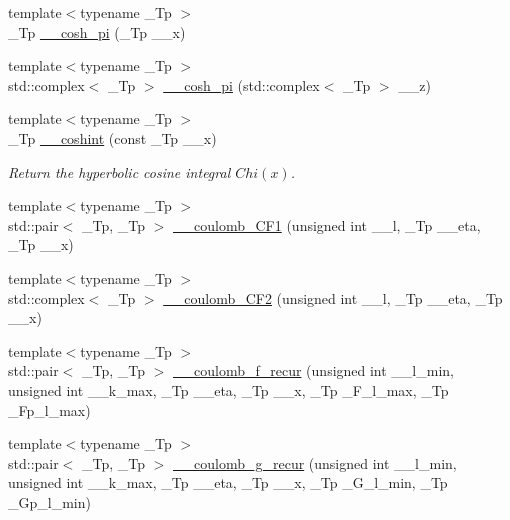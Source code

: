 \begin{DoxyCompactItemize}
\item 
{\footnotesize template$<$typename \+\_\+\+Tp $>$ }\\\+\_\+\+Tp \hyperlink{namespacestd_1_1____detail_ae6e440447e88191b3cd19daaf7fda96e}{\+\_\+\+\_\+cosh\+\_\+pi} (\+\_\+\+Tp \+\_\+\+\_\+x)
\item 
{\footnotesize template$<$typename \+\_\+\+Tp $>$ }\\std\+::complex$<$ \+\_\+\+Tp $>$ \hyperlink{namespacestd_1_1____detail_a257e13bd4fa9711a87ea68a783ee40d9}{\+\_\+\+\_\+cosh\+\_\+pi} (std\+::complex$<$ \+\_\+\+Tp $>$ \+\_\+\+\_\+z)
\item 
{\footnotesize template$<$typename \+\_\+\+Tp $>$ }\\\+\_\+\+Tp \hyperlink{namespacestd_1_1____detail_ad48a89a591f7b58a047f072e6e383663}{\+\_\+\+\_\+coshint} (const \+\_\+\+Tp \+\_\+\+\_\+x)
\begin{DoxyCompactList}\small\item\em Return the hyperbolic cosine integral $ Chi(x) $. \end{DoxyCompactList}\item 
{\footnotesize template$<$typename \+\_\+\+Tp $>$ }\\std\+::pair$<$ \+\_\+\+Tp, \+\_\+\+Tp $>$ \hyperlink{namespacestd_1_1____detail_a0737f268d024ed5d66d3e926239a5c49}{\+\_\+\+\_\+coulomb\+\_\+\+C\+F1} (unsigned int \+\_\+\+\_\+l, \+\_\+\+Tp \+\_\+\+\_\+eta, \+\_\+\+Tp \+\_\+\+\_\+x)
\item 
{\footnotesize template$<$typename \+\_\+\+Tp $>$ }\\std\+::complex$<$ \+\_\+\+Tp $>$ \hyperlink{namespacestd_1_1____detail_a400332397b6d529764b61bdd7726f75c}{\+\_\+\+\_\+coulomb\+\_\+\+C\+F2} (unsigned int \+\_\+\+\_\+l, \+\_\+\+Tp \+\_\+\+\_\+eta, \+\_\+\+Tp \+\_\+\+\_\+x)
\item 
{\footnotesize template$<$typename \+\_\+\+Tp $>$ }\\std\+::pair$<$ \+\_\+\+Tp, \+\_\+\+Tp $>$ \hyperlink{namespacestd_1_1____detail_ab6a730206fba9db024f3c1c26fe6a954}{\+\_\+\+\_\+coulomb\+\_\+f\+\_\+recur} (unsigned int \+\_\+\+\_\+l\+\_\+min, unsigned int \+\_\+\+\_\+k\+\_\+max, \+\_\+\+Tp \+\_\+\+\_\+eta, \+\_\+\+Tp \+\_\+\+\_\+x, \+\_\+\+Tp \+\_\+\+F\+\_\+l\+\_\+max, \+\_\+\+Tp \+\_\+\+Fp\+\_\+l\+\_\+max)
\item 
{\footnotesize template$<$typename \+\_\+\+Tp $>$ }\\std\+::pair$<$ \+\_\+\+Tp, \+\_\+\+Tp $>$ \hyperlink{namespacestd_1_1____detail_ad3bcd9e0587db5699088065900382e8b}{\+\_\+\+\_\+coulomb\+\_\+g\+\_\+recur} (unsigned int \+\_\+\+\_\+l\+\_\+min, unsigned int \+\_\+\+\_\+k\+\_\+max, \+\_\+\+Tp \+\_\+\+\_\+eta, \+\_\+\+Tp \+\_\+\+\_\+x, \+\_\+\+Tp \+\_\+\+G\+\_\+l\+\_\+min, \+\_\+\+Tp \+\_\+\+Gp\+\_\+l\+\_\+min)

\end{DoxyCompactItemize}
